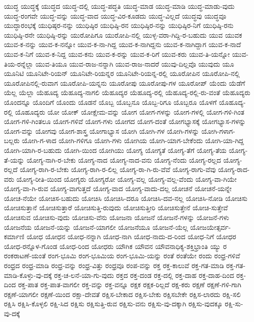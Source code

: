 {ಯುದ್ಧ
ಯುದ್ಧಕ್ಕೆ
ಯುದ್ಧದ
ಯುದ್ಧ-ದಲ್ಲಿ
ಯುದ್ಧ-ಪದ್ಧತಿ
ಯುದ್ಧ-ಮಾಡ
ಯುದ್ಧ-ಮಾಡಿ
ಯುದ್ಧ-ಮಾಡು-ವುದು
ಯುದ್ಧ-ರಂಗವೇ
ಯುದ್ಧ-ವನ್ನು
ಯುದ್ಧ-ವಾದ
ಯುದ್ಧ-ವಿರ-ಕೂಡದು
ಯುದ್ಧ-ವಿಲ್ಲದೆ
ಯುದ್ಧವು
ಯುದ್ಧವೂ
ಯುದ್ಧಾರಂಭಕ್ಕೆ
ಯುಧಿಷ್ಠರ-ನನ್ನು
ಯುಧಿಷ್ಠಿರ
ಯುಧಿಷ್ಠಿ-ರನ
ಯುಧಿಷ್ಠಿರ-ನನ್ನು
ಯುಧಿಷ್ಠಿರ-ನಿಗೆ
ಯುಧಿಷ್ಠಿ-ರನು
ಯುಧಿಷ್ಠಿ-ರನೇ
ಯುಧಿಷ್ಠಿ-ರನ್ನು
ಯುರೋಪಿಗೂ
ಯುರೋಪಿ-ನಲ್ಲಿ
ಯುಳ್ಳ-ವರಾ-ಗಿದ್ದಿ-ರ-ಬಹುದು
ಯುವ
ಯುವಕ
ಯುವ-ಕ-ನನ್ನು
ಯುವ-ಕ-ನನ್ನೋ
ಯುವ-ಕ-ನಾ-ಗಿದ್ದ
ಯುವ-ಕ-ನಾಗಿದ್ದನು
ಯುವ-ಕ-ನಾಗಿದ್ದಾಗ
ಯುವ-ಕ-ನಾದೆ
ಯುವ-ಕ-ನಿಗೆ
ಯುವ-ಕ-ನಿದ್ದ
ಯುವ-ಕನು
ಯುವ-ಕ-ರನ್ನು
ಯುವ-ಕ-ರಿಗೆ
ಯುವ-ಕರು
ಯುವ-ತಿ-ಯನ್ನೋ
ಯುವ-ತಿಯ-ರನ್ನೆಲ್ಲಾ
ಯುವ-ತಿಯೂ
ಯುವ-ರಾಜ-ನನ್ನಾಗಿ
ಯುವ-ರಾಜ-ನಾದರೆ
ಯುವು-ದಿಲ್ಲವೊ
ಯುವುದು
ಯೂ
ಯೂನಿಟಿ
ಯೂನಿಟೇ-ರಿಯನ್
ಯೂನಿಟೇ-ರಿಯನ್ನರ
ಯೂನಿಟೇ-ರಿಯನ್ನ-ರಲ್ಲಿ
ಯೂರೋಪಿನ
ಯೂರೋಪಿ-ನಲ್ಲಿ
ಯೂರೋಪಿನಲ್ಲಿ-ರುವಾಗ
ಯೂರೋಪಿ-ಯನ್ನನು
ಯೂರೋಪು
ಯೂರೋಪು-ಗಳ
ಯೂರೋಪ್
ಯೆಂದು
ಯೆಡೆಗೆ
ಯೆಲ್ಲ
ಯೆಲ್ಲಾ
ಯೆಹೂದ್ಯ
ಯೆಹೂದ್ಯ-ನಾಗಲಿ
ಯೆಹೂದ್ಯರ
ಯೆಹೂದ್ಯ-ರಲ್ಲಿ
ಯೆಹೂದ್ಯ-ರಲ್ಲಿ-ರು-ವಂತೆ
ಯೆಹೂದ್ಯರು
ಯೊಂದನ್ನೂ
ಯೊಂದಿಗೆ
ಯೊಂದು
ಯೊಡನೆ
ಯೊಬ್ಬ
ಯೊಬ್ಬನೂ
ಯೊಬ್ಬ-ರಿಗೂ
ಯೊಬ್ಬರೂ
ಯೊಳಗೆ
ಯೊಹೂದ್ಯ-ರಲ್ಲಿ
ಯೊಹೂದ್ಯರು
ಯೋ
ಯೋಕ್
ಯೋಕ್ಷೇಮ-ವನ್ನು
ಯೋಗ
ಯೋಗ-ಗಳನ್ನು
ಯೋಗ-ಗಳಲ್ಲಿ
ಯೋಗ-ಗಳಿ-ಗಿಂತ
ಯೋಗ-ಗಳಿ-ಗಿಂತಲೂ
ಯೋಗ-ಗಳಿವೆ
ಯೋಗ-ಗಳು
ಯೋಗದ
ಯೋಗ-ದಂತೆ
ಯೋಗಭ್ಯಾಸಕ್ಕೆ
ಯೋಗಭ್ಯಾಸ-ಗಳನ್ನು
ಯೋಗ-ವನ್ನು
ಯೋಗವು
ಯೋಗ-ಶಾಸ್ತ್ರ
ಯೋಗಾಭ್ಯಾಸ
ಯೋಗಿ
ಯೋಗಿ-ಗಳ
ಯೋಗಿ-ಗಳನ್ನು
ಯೋಗಿ-ಗಳಾಗ-ಬಲ್ಲರು
ಯೋಗಿ-ಗ-ಳಾದ
ಯೋಗಿ-ಗಳಿಗೂ
ಯೋಗಿ-ಗಳು
ಯೋಗಿಯ
ಯೋಗಿ-ಯಾಗ-ಬೇಕೆಂದು
ಯೋಗಿ-ಯಾ-ಗಿದ್ದ
ಯೋಗಿ-ಯಾಗಿ-ರ-ಬಹುದು
ಯೋಗಿ-ಯಿಂದ
ಯೋಗಿಯು
ಯೋಗ್ಯ
ಯೋಗ್ಯತೆ
ಯೋಗ್ಯ-ತೆಗೆ
ಯೋಗ್ಯ-ತೆಯ
ಯೋಗ್ಯ-ತೆ-ಯನ್ನು
ಯೋಗ್ಯ-ನಾಗಿ-ರ-ಬೇಕು
ಯೋಗ್ಯ-ನಾದ
ಯೋಗ್ಯ-ನಾದ-ವನು
ಯೋಗ್ಯ-ನೆಂದು
ಯೋಗ್ಯ-ರಲ್ಲದ
ಯೋಗ್ಯ-ರಲ್ಲದೆ
ಯೋಗ್ಯ-ರಾಗಿ-ರ-ಬೇಕು
ಯೋಗ್ಯ-ರಾಗಿ-ರ-ಲಿಲ್ಲ
ಯೋಗ್ಯ-ರಾ-ಗಿ-ರು-ವೆವೆ
ಯೋಗ್ಯ-ರಾಗು-ವೆವು
ಯೋಗ್ಯ-ರಾದ-ವರು
ಯೋಗ್ಯ-ರೀತಿ-ಯಿಂದ
ಯೋಗ್ಯರು
ಯೋಗ್ಯರೋ
ಯೋಗ್ಯ-ವಲ್ಲ
ಯೋಗ್ಯ-ವಲ್ಲ-ವೆಂದು
ಯೋಗ್ಯ-ವಾ-ಗಿಯೇ
ಯೋಗ್ಯ-ವಾ-ಗಿ-ರುವ
ಯೋಗ್ಯ-ವಾಗುತ್ತದೆ
ಯೋಗ್ಯ-ವಾದ
ಯೋಗ್ಯ-ವಾದು-ದಲ್ಲ
ಯೋಚನೆ
ಯೋಚನೆ-ಯನ್ನೇ
ಯೋಚ-ನೆಯೇ
ಯೋಚಿಸ-ಬಹುದು
ಯೋಚಿಸಿ
ಯೋಚಿಸಿ-ದರೂ
ಯೋಚಿಸಿ-ದವ-ನಲ್ಲ
ಯೋಚಿಸಿ-ನೋಡಿ
ಯೋಚಿಸು
ಯೋಚಿಸುತ್ತಾನೆ
ಯೋಚಿಸುತ್ತಾರೆ
ಯೋಚಿಸುತ್ತಿ-ರುವುದು
ಯೋಚಿಸುತ್ತೀರಿ
ಯೋಚಿಸುತ್ತೇನೆ
ಯೋಚಿ-ಸುತ್ತೇವೆ
ಯೋಚಿಸುವ
ಯೋಚಿಸು-ವುದು
ಯೋಚಿಸು-ವೆನು
ಯೋಜನಾ
ಯೋಜನೆ
ಯೋಜನೆ-ಗಳನ್ನು
ಯೋಜನೆ-ಗಳು
ಯೋಜನೆಯ
ಯೋಜನೆ-ಯನ್ನು
ಯೋಜನೆ-ಯಾಗಲೀ
ಯೋಜನೆಯೂ
ಯೋಜನೆ-ಯೆಲ್ಲ
ಯೋಜಯೇತ್ಸರ್ವ-ಕರ್ಮಾಣಿ
ಯೋಧ
ಯೋಧನ
ಯೋಧ-ನನ್ನಾಗಿ
ಯೋಧ-ನಾಗಿ
ಯೋಧ-ನಾದು-ದ-ರಿಂದ
ಯೋಧ-ನಿಗೆ
ಯೋಧರ
ಯೋಧ-ರನ್ನೊಳ-ಗೊಂಡ
ಯೋಧ-ರಿಂದ
ಯೋಧರು
ಯೌಗಿಕ
ಯೌವನ
ಯೌವನಾಧಿಕ್ಯ-ಶಕ್ತಿಭ್ರಾಂತಿ
ಯ್ಯು
ರ
ರಂಕರಾಟಣೆ-ಯಂತೆ
ರಂಗ-ಭೂಮಿ
ರಂಗ-ಭೂಮಿಯ
ರಂಗ-ಭೂಮಿ-ಯನ್ನು
ರಂತೆ
ರಂತೆಯೇ
ರಂದು
ರಂಧ್ರ-ಗಳಿವೆ
ರಂಧ್ರದ
ರಂಧ್ರ-ಮಾಡಿ
ರಂಧ್ರ-ವನ್ನು
ರಂಧ್ರ-ವಿತ್ತು
ರಂಧ್ರವೂ
ರಂಪ-ವನ್ನು
ರಕ್ತ
ರಕ್ತ-ಕಾಲುವೆ
ರಕ್ತ-ಗತ-ಮಾಡಿ
ರಕ್ತ-ಗತ-ಮಾಡಿ-ಕೊಳ್ಳು-ವು-ದಕ್ಕೆ
ರಕ್ತ-ಚ-ಲನೆ-ಯಾ-ಗು-ವುದು
ರಕ್ತದ
ರಕ್ತ-ದಂಡ
ರಕ್ತ-ದಲ್ಲಿ
ರಕ್ತ-ದಾಹ
ರಕ್ತ-ದಾಹ-ದಿಂದ
ರಕ್ತ-ದಿಂದ
ರಕ್ತ-ಪಾತ
ರಕ್ತ-ಪಾತ-ವಾಗಲೀ
ರಕ್ತ-ವನ್ನು
ರಕ್ತ-ವನ್ನೂ
ರಕ್ಷಕ
ರಕ್ಷಕ-ರಿಲ್ಲದೆ
ರಕ್ಷ-ಕರು
ರಕ್ಷಣೆ
ರಕ್ಷಣೆ-ಗಳಿ-ಗಾಗಿ
ರಕ್ಷಣೆ-ಯಾಗಲೀ
ರಕ್ಷಣೆ-ಯಿಂದ
ರಕ್ಷಾ-ದೇವತೆ
ರಕ್ಷಿಸ-ಬೇಕಾದ
ರಕ್ಷಿಸ-ಬೇಕು
ರಕ್ಷಿಸಬೇಕೇ
ರಕ್ಷಿಸ-ಲಾರದು
ರಕ್ಷಿ-ಸಲಿ
ರಕ್ಷಿಸಿ
ರಕ್ಷಿಸಿ-ಕೊಳ್ಳಲಿ
ರಕ್ಷಿ-ಸಿದ
ರಕ್ಷಿಸು
ರಕ್ಷಿಸುತ್ತಿ-ರುವ
ರಕ್ಷಿಸು-ವನು
ರಕ್ಷಿಸು-ವು-ದಕ್ಕಾಗಿ
ರಕ್ಷಿಸು-ವುದಕ್ಕೂ
ರಕ್ಷಿ-ಸು-ವು-ದಕ್ಕೆ
}
